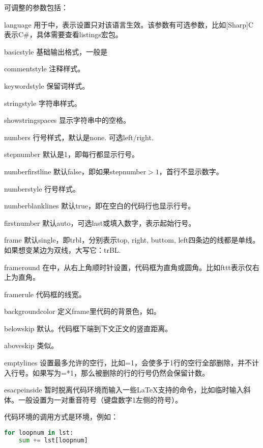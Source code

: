 可调整的参数包括：
\begin{para}
\item[language] 用于中，表示设置只对该语言生效。该参数有可选参数，比如[Sharp]C表示C\#，具体需要查看listings宏包。
\item[basicstyle] 基础输出格式，一般是
\item[commentstyle] 注释样式。
\item[keywordstyle] 保留词样式。
\item[stringstyle] 字符串样式。
\item[showstringspaces] 显示字符串中的空格。
\item[numbers] 行号样式，默认是none. 可选left/right.
\item[stepnumber] 默认是1，即每行都显示行号。
\item[numberfirstline] 默认false，即如果stepnumber$>1$，首行不显示数字。
\item[numberstyle] 行号样式。
\item[numberblanklines] 默认true，即在空白的代码行也显示行号。
\item[firstnumber] 默认auto，可选last或填入数字，表示起始行号。
\item[frame] 默认single，即trbl，分别表示top, right, buttom, left四条边的线都是单线。如果想变某边为双线，大写它：trBL.
\item[frameround] 在中，从右上角顺时针设置，代码框为直角或圆角。比如fttt表示仅右上为直角。
\item[framerule] 代码框的线宽。
\item[backgroundcolor] 定义frame里代码的背景色，如。
\item[belowskip] 默认。代码框下端到下文正文的竖直距离。
\item[aboveskip] 类似。
\item[emptylines] 设置最多允许的空行，比如=1，会使多于1行的空行全部删除，并不计入行号。如果写为=*1，那么被删除的行的行号仍然会保留计数。
\item[esacpeinside] 暂时脱离代码环境而输入一些\LaTeX 支持的命令，比如临时输入斜体。一般设置为一对重音符号（键盘数字1左侧的符号）。
\end{para}

代码环境的调用方式是环境，例如：
\begin{latex}
\begin{lstlisting}[language=Python]
for loopnum in lst:
    sum += lst[loopnum]
\end{lstlisting}
\end{latex}

